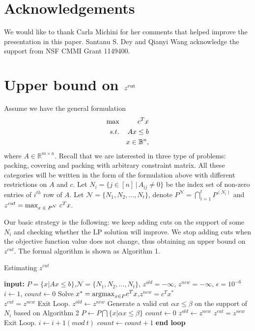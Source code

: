 \documentclass[smallextended]{svjour3}
\begin{document}
\section{Acknowledgements}
We would like to thank Carla Michini for her comments that helped improve the presentation in this paper. Santanu S. Dey and Qianyi Wang acknowledge the support from NSF CMMI Grant 1149400.

\ifmp
	  
\else
	
\fi


\appendix
\section{Upper bound on $z^{\textup{cut}}$}\label{AppendixCutAlgo}
Assume we have the general formulation
\begin{eqnarray*}
\textup{max}&&  c^Tx \notag \\
s.t. &&Ax \leq b \notag \\
&&x \in \mathbb{B}^n,
\end{eqnarray*}
where $A \in {\mathbb{R}}^{m\times n}$. Recall that we are interested in three
type of problems: packing, covering and packing with arbitrary
constraint matrix. All these categories will be written in the form of the 
formulation above with different restrictions on $A$ and $c$. Let
$N_i = \{j \in [n]\,|\, A_{ij} \neq 0\}$ be the index set of non-zero
entries of $i^{th}$ row of $A$. Let $\mathcal{N} = \{N_1, N_2,\ldots, N_t\}$, denote $P^{\mathcal{N}} = \bigcap_{i = 1}^t P^{(N_i)}$ and $z^{cut} = \textup{max}_{\textup{$x \in P^{\mathcal{N}}$}}~ c^Tx $. 

Our basic strategy is the following: we keep adding cuts on the support of some
$N_i$ and checking whether the LP solution will improve. We stop adding cuts when the objective function value does not change, thus obtaining an upper bound on $z^{cut}$. The formal
algorithm is shown as Algorithm 1.

\begin{algorithm}[h!]\label{alg:1}
\caption{Estimating $z^{cut}$}
\begin{algorithmic}
\STATE \textbf{input:} {$P = \{x | Ax \leq b \}$,$\mathcal{N} = \{N_1,N_2,\ldots, N_t\}$, $z^{old} = -\infty$, $z^{new} = -\infty$, $\epsilon = 10^{-6}$}
\STATE  $i \leftarrow 1$, $count \leftarrow 0$ 
\LOOP
\STATE  Solve $x^* = \textup{argmax}_{x \in P} c^Tx$,$z^{new} = c^Tx^*$\;\\
\STATE $z^{cut} = z^{new}$ 
\STATE Exit Loop.
\STATE $z^{old} \leftarrow z^{new}$
\STATE Generate a valid cut $\alpha x \leq \beta$ on the support of $N_i$ based on Algorithm 2
\STATE $P \leftarrow P \bigcap \{x| \alpha x \leq \beta\}$
\STATE  $count \leftarrow 0$
\ELSE 
\STATE $z^{old} \leftarrow z^{new}$
\STATE $z^{cut} = z^{new}$
\STATE Exit Loop.
\ELSE
\STATE $i \leftarrow i+1 (mod \ t)$
\STATE $count \leftarrow count+1$
\ENDIF
\ENDIF
\STATE 
\ENDLOOP
\textbf{end loop}
\end{algorithmic}
\end{algorithm}
\end{document}
